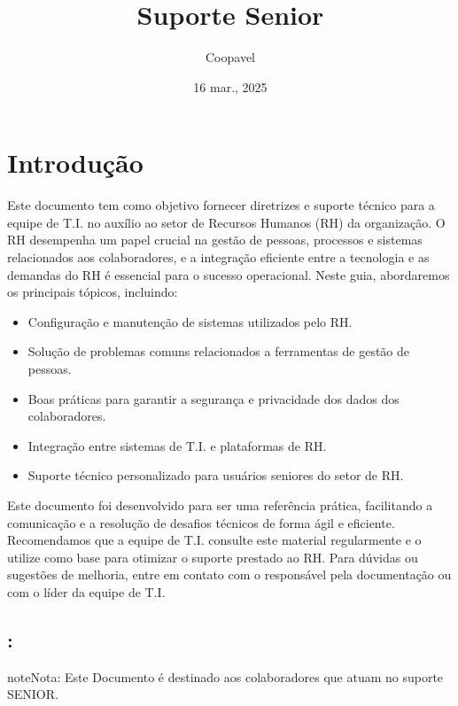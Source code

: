 \documentclass[letterpaper,10pt,portuges]{sphinxmanual}
\title{Suporte Senior}
\date{16 mar., 2025}
\author{Coopavel}
\let\sphinxpxdimen\pdfpxdimen\else\newdimen\sphinxpxdimen
\begin{document}
\pagestyle{empty}
\sphinxmaketitle
\pagestyle{plain}
\sphinxtableofcontents
\pagestyle{normal}
\label{\detokenize{index::doc}}

\label{\detokenize{index:introducao}}
\noindent\sphinxincludegraphics[width=200\sphinxpxdimen]{{coopavel}.png}


\chapter{Introdução}
\label{\detokenize{index:id1}}
\sphinxAtStartPar
Este documento tem como objetivo fornecer diretrizes e suporte técnico para a equipe de T.I. no auxílio ao setor de Recursos Humanos (RH) da organização. O RH desempenha um papel crucial na gestão de pessoas, processos e sistemas relacionados aos colaboradores, e a integração eficiente entre a tecnologia e as demandas do RH é essencial para o sucesso operacional.
Neste guia, abordaremos os principais tópicos, incluindo:
\begin{itemize}
\item {} 
\sphinxAtStartPar
Configuração e manutenção de sistemas utilizados pelo RH.

\item {} 
\sphinxAtStartPar
Solução de problemas comuns relacionados a ferramentas de gestão de pessoas.

\item {} 
\sphinxAtStartPar
Boas práticas para garantir a segurança e privacidade dos dados dos colaboradores.

\item {} 
\sphinxAtStartPar
Integração entre sistemas de T.I. e plataformas de RH.

\item {} 
\sphinxAtStartPar
Suporte técnico personalizado para usuários seniores do setor de RH.

\end{itemize}

\sphinxAtStartPar
Este documento foi desenvolvido para ser uma referência prática, facilitando a comunicação e a resolução de desafios técnicos de forma ágil e eficiente. Recomendamos que a equipe de T.I. consulte este material regularmente e o utilize como base para otimizar o suporte prestado ao RH.
Para dúvidas ou sugestões de melhoria, entre em contato com o responsável pela documentação ou com o líder da equipe de T.I.


\section{:}
\label{\detokenize{index:publico-alvo}}
\begin{sphinxadmonition}{note}{Nota:}
\sphinxAtStartPar
Este Documento é destinado aos colaboradores que atuam no suporte
SENIOR.
\end{sphinxadmonition}
\end{document}
